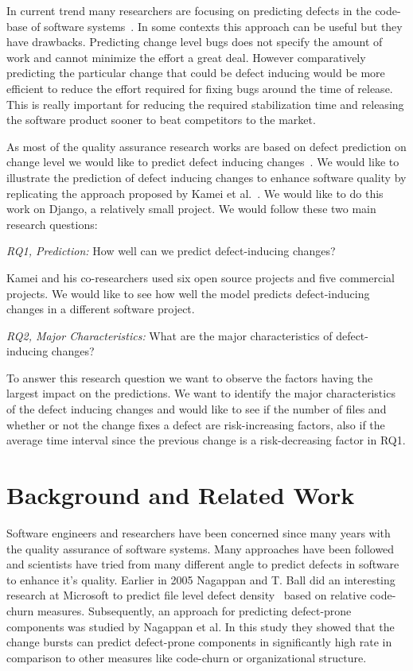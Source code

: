 \documentclass[10pt, conference]{IEEEtran}
\begin{document}
In current trend many researchers are focusing on predicting defects in the code-base of software systems~\cite{Gyimothy2005IEEE}. In some contexts this approach can be useful but they have drawbacks. Predicting change level bugs does not specify the amount of work and cannot minimize the effort a great deal. However comparatively predicting the particular change that could be defect inducing would be more efficient to reduce the effort required for fixing bugs around the time of release. This is really important for reducing the required stabilization time and releasing the software product sooner to beat competitors to the market.

As most of the quality assurance research works are based on defect prediction on change level we would like to predict defect inducing changes~\cite{Kim2008TSE}. We would like to illustrate the prediction of defect inducing changes to enhance software quality by replicating the approach proposed by Kamei et al.~\cite{Kamei2013TSE}. We would like to do this work on Django, a relatively small project. We would follow these two main research questions:

\textit{RQ1, Prediction:} How well can we predict defect-inducing changes?

Kamei and his co-researchers used six open source projects and five commercial projects. We would like to see how well the model predicts defect-inducing changes in a different software project.

\textit{RQ2, Major Characteristics:} What are the major characteristics of defect-inducing changes?

To answer this research question we want to observe the factors having the largest impact on the predictions. We want to identify the major characteristics of the defect inducing changes and would like to see if the number of files and whether or not the change fixes a defect are risk-increasing factors, also if the average time interval since the previous change is a risk-decreasing factor in RQ1.

\section{Background and Related Work}
\label{sec:backgr-relat-work}

Software engineers and researchers have been concerned since many years with the quality assurance of software systems. Many approaches have been followed and scientists have tried from many different angle to predict defects in software to enhance it's quality. Earlier in 2005 Nagappan and T. Ball did an interesting research at Microsoft to predict file level defect density~\cite{Nagappan2005ICSE} based on relative code-churn measures. Subsequently, an approach for predicting defect-prone components was studied by Nagappan et al. In this study they showed that the change bursts can predict defect-prone components in significantly high rate in comparison to other measures like code-churn or organizational structure.
\end{document}
